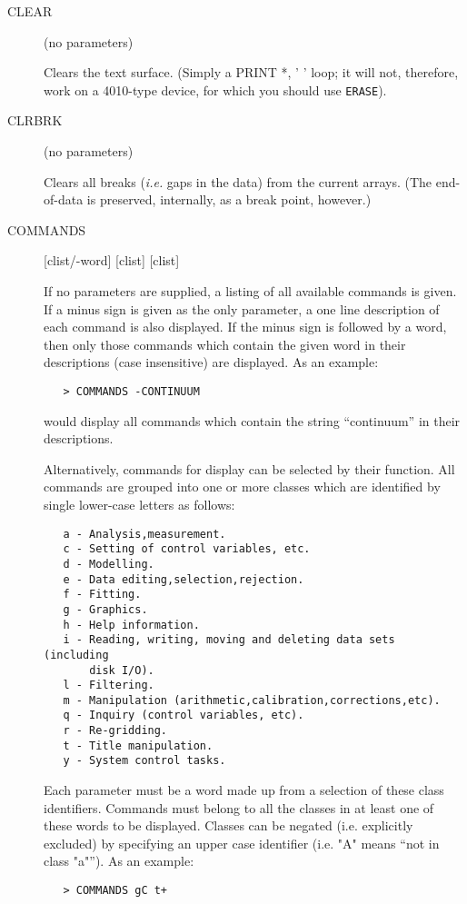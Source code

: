 \documentclass[twoside,11pt]{article}
\newcommand{\htmlref}[2]{#1}
\newcommand{\xlabel}[1]{}
\renewcommand{\_}{\texttt{\symbol{95}}}
\newcommand{\dipcom}[3] { \item [{#1}] {#2} \par }
\newcommand{\dipcom}[3] { \end{description}
                            \subsection{\xlabel{#1}{#1} - {#3}}
                            \label{COM:#1}
                            \begin{description}
                            \item [Syntax:] {\tt{#1} {#2}}
                            \par
                            \item [Description:]}
\begin{document}
\begin {description}
\dipcom{CLEAR}{(no parameters)}{Clears the command window}
Clears the text surface. (Simply a PRINT *, ' ' loop; it will not,
therefore, work on a 4010-type device, for which you should use
\htmlref{{\tt{ERASE}}}{COM:ERASE}). 

\dipcom{CLRBRK}{(no parameters)}{Removes breaks from an array}
Clears all breaks ({\em i.e.} gaps in the data) from the current
arrays. (The end-of-data is preserved, internally, as a break point,
however.)

\dipcom{COMMANDS}{[clist/-word] [clist] [clist]}{Display classified lists of commands with brief descriptions}
If no parameters are supplied, a listing of all available commands is
given. If a minus sign is given as the only parameter, a one line
description of each command is also displayed. If the minus sign is
followed by a word, then only those commands which contain the given
word in their descriptions (case insensitive) are displayed. As an example:

\begin{verbatim}
   > COMMANDS -CONTINUUM
\end{verbatim}

would display all commands which contain the string ``continuum'' in their
descriptions.

Alternatively, commands for display can be selected by their function.
All commands are grouped into one or more classes which are identified
by single lower-case letters as follows:

\begin{verbatim}
   a - Analysis,measurement.
   c - Setting of control variables, etc.
   d - Modelling.
   e - Data editing,selection,rejection.
   f - Fitting.
   g - Graphics.
   h - Help information.
   i - Reading, writing, moving and deleting data sets (including 
       disk I/O).
   l - Filtering.
   m - Manipulation (arithmetic,calibration,corrections,etc).
   q - Inquiry (control variables, etc).
   r - Re-gridding.
   t - Title manipulation.
   y - System control tasks.
\end{verbatim}

Each parameter must be a word made up from a selection of these class
identifiers. Commands must belong to all the classes in at least one of
these words to be displayed. Classes can be negated (i.e. explicitly
excluded) by specifying an upper case identifier (i.e. "A" means ``not
in class "a"''). As an example:

\begin{verbatim}
   > COMMANDS gC t+
\end{verbatim}


\end{description}
\end{document}
